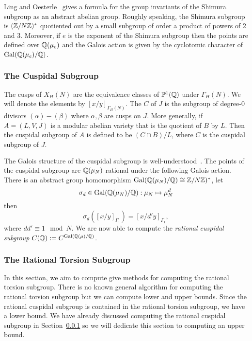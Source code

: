 \documentclass{article}
\begin{document}
Ling and Oesterle~\cite[Theorem 1,2]{ling-oesterle:shimura} gives a formula for
the group invariants of the Shimura subgroup as an abstract abelian group.
Roughly speaking, the Shimura subgroup is $(\mathbb{Z}/N\mathbb{Z})^*$ quotiented out by a
small subgroup of order a product of powers of 2 and 3. Moreover, if $e$ is the
exponent of the Shimura subgroup then the points are defined over $\mathbb{Q}(\mu_e)$
and the Galois action is given by the cyclotomic character of
$\operatorname{Gal}(\mathbb{Q}(\mu_e)/\mathbb{Q})$.


\subsubsection{The Cuspidal Subgroup}
\label{sec:cuspidal_subgroup}

The cusps of $X_H(N)$ are the equivalence classes of $\mathbb{P}^1(\mathbb{Q})$ under
$\Gamma_H(N)$. We will denote the elements by $[x/y]_{\Gamma_H(N)}$. The
 $C$ of $J$ is the subgroup of degree-0 divisors
$(\alpha)-(\beta)$ where $\alpha, \beta$ are cusps on $J$. More generally, if
$A=(L, V, J)$ is a modular abelian variety that is the quotient of $B$ by $L$.
Then the cuspidal subgroup of $A$ is defined to be $(C\cap B)/L$, where $C$ is
the cuspidal subgroup of $J$.

The Galois structure of the cuspidal subgroup is well-understood~\cite[\S
1.3]{stevens:arithmetic_modular}. The points of the cuspidal subgroup are $\mathbb{Q}(\mu_N)$-rational
under the following Galois action. There is an abstract group homomorphism
$\operatorname{Gal}(\mathbb{Q}(\mu_N)/\mathbb{Q})\cong \mathbb{Z}/N\mathbb{Z})^*$, let
\[
    \sigma_d\in \operatorname{Gal}(\mathbb{Q}(\mu_N)/\mathbb{Q}):\mu_N\mapsto \mu_N ^d
\]
then
\[
    \sigma_d([x/y]_{\Gamma_1})=[x/d'y]_{\Gamma_1},
\]
where $dd'\equiv 1 \mod{N}$. We are now able to compute the
\emph{rational cuspidal subgroup} $C(\mathbb{Q}):=C^{\operatorname{Gal}(\mathbb{Q}(\mu)/\mathbb{Q})}$.

\subsubsection{The Rational Torsion Subgroup}

In this section, we aim to compute give methods for computing the rational
torsion subgroup. There is no known general algorithm for computing the
rational torsion subgroup but we can compute lower and upper bounds.
Since the rational cuspidal subgroup is contained in the rational torsion
subgroup, we have a lower bound. We have already discussed computing the
rational cuspidal subgroup in Section~\ref{sec:cuspidal_subgroup} so we will
dedicate this section to computing an upper bound.
\end{document}
